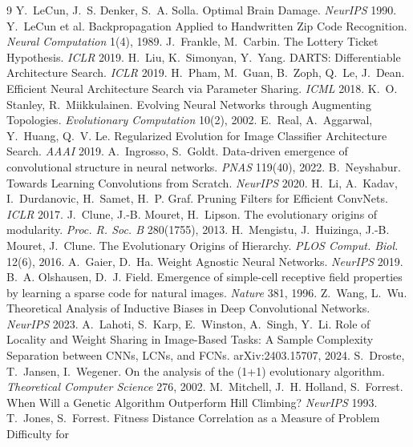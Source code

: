 \documentclass[11pt]{article}
\begin{document}
\begin{thebibliography}{9}\setlength{\itemsep}{0pt}\setlength{\parskip}{0pt}
 Y.~LeCun, J.~S. Denker, S.~A. Solla. Optimal Brain Damage. \emph{NeurIPS} 1990.
 Y.~LeCun et al. Backpropagation Applied to Handwritten Zip Code Recognition.
 \emph{Neural Computation} 1(4), 1989.
 J.~Frankle, M.~Carbin. The Lottery Ticket Hypothesis. \emph{ICLR} 2019.
 H.~Liu, K.~Simonyan, Y.~Yang. DARTS: Differentiable Architecture Search. \emph{ICLR} 2019.
 H.~Pham, M.~Guan, B.~Zoph, Q.~Le, J.~Dean. Efficient Neural Architecture Search via
 Parameter Sharing. \emph{ICML} 2018.
 K.~O. Stanley, R.~Miikkulainen. Evolving Neural Networks through Augmenting Topologies.
 \emph{Evolutionary Computation} 10(2), 2002.
 E.~Real, A.~Aggarwal, Y.~Huang, Q.~V. Le. Regularized Evolution for Image Classifier
 Architecture Search. \emph{AAAI} 2019.
 A.~Ingrosso, S.~Goldt. Data-driven emergence of convolutional structure in neural
 networks. \emph{PNAS} 119(40), 2022.
 B.~Neyshabur. Towards Learning Convolutions from Scratch. \emph{NeurIPS} 2020.
 H.~Li, A.~Kadav, I.~Durdanovic, H.~Samet, H.~P. Graf. Pruning Filters for Efficient
 ConvNets. \emph{ICLR} 2017.
 J.~Clune, J.-B. Mouret, H.~Lipson. The evolutionary origins of modularity.
 \emph{Proc. R. Soc. B} 280(1755), 2013.
 H.~Mengistu, J.~Huizinga, J.-B. Mouret, J.~Clune. The Evolutionary Origins of Hierarchy.
 \emph{PLOS Comput. Biol.} 12(6), 2016.
 A.~Gaier, D.~Ha. Weight Agnostic Neural Networks. \emph{NeurIPS} 2019.
 B.~A. Olshausen, D.~J. Field. Emergence of simple-cell receptive field properties by
 learning a sparse code for natural images. \emph{Nature} 381, 1996.
 Z.~Wang, L.~Wu. Theoretical Analysis of Inductive Biases in Deep Convolutional Networks.
 \emph{NeurIPS} 2023.
 A.~Lahoti, S.~Karp, E.~Winston, A.~Singh, Y.~Li. Role of Locality and Weight Sharing in
 Image-Based Tasks: A Sample Complexity Separation between CNNs, LCNs, and FCNs. arXiv:2403.15707, 2024.
 S.~Droste, T.~Jansen, I.~Wegener. On the analysis of the (1+1) evolutionary algorithm.
 \emph{Theoretical Computer Science} 276, 2002.
 M.~Mitchell, J.~H. Holland, S.~Forrest. When Will a Genetic Algorithm Outperform Hill
 Climbing? \emph{NeurIPS} 1993.
 T.~Jones, S.~Forrest. Fitness Distance Correlation as a Measure of Problem Difficulty for

\end{thebibliography}
\end{document}
